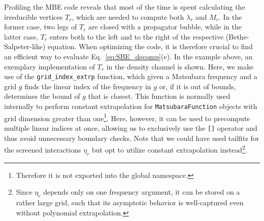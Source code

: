 \documentclass{SciPost}
\begin{document}
%
Profiling the MBE code reveals that most of the time is spent calculating the irreducible vertices $T_r$, which are needed to compute both $\lambda_r$ and $M_r$. In the former case, two legs of $T_r$ are closed with a propagator bubble, while in the latter case, $T_r$ enters both to the left and to the right of the respective (Bethe-Salpeter-like) equation. When optimizing the code, it is therefore crucial to find an efficient way to evaluate Eq.~\eqref{eq:SBE_decomp}(e). In the example above, an exemplary implementation of $T_r$ in the density channel is shown. Here, we make use of the \texttt{grid\_index\_extrp} function, which given a Matsubara frequency and a grid $g$ finds the linear index of the frequency in $g$ or, if it is out of bounds, determines the bound of $g$ that is closest. This function is normally used internally to perform constant extrapolation for \texttt{MatsubaraFunction} objects with grid dimension greater than one\footnote{ Therefore it is not exported into the global namespace.}. Here, however, it can be used to precompute multiple linear indices at once, allowing us to exclusively use the \texttt{[]} operator and thus avoid unnecessary boundary checks. Note that we could have used tailfits for the screened interactions $\eta_r$ but opt to utilize constant extrapolation instead\footnote{ Since $\eta_r$ depends only on one frequency argument, it can be stored on a rather large grid, such that its asymptotic behavior is well-captured even without polynomial extrapolation.}. 
\end{document}
